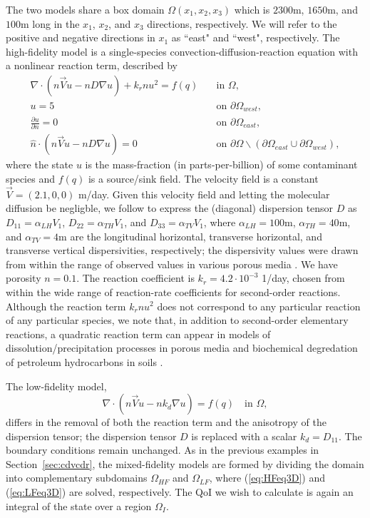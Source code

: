 The two models share a box domain $\Omega(x_1,x_2,x_3)$ which is $2300$m, $1650$m, and $100$m long in the $x_1$, $x_2$, and $x_3$ directions, respectively. We will refer to the positive and negative directions in $x_1$ as ``east" and ``west", respectively. The high-fidelity model is a single-species convection-diffusion-reaction equation with a nonlinear reaction term, described by
%
\begin{subequations}
\label{eq:cdvcdrHF3D}
\begin{align}
\nabla\cdot(n\vec{V}u - nD\nabla u) + k_rnu^2 = f(q) \quad &\text{in } \Omega, \label{eq:HFeq3D}\\
u = 5 \quad &\text{on } \partial \Omega_{west}, \\
\frac{\partial u}{\partial n} = 0 \quad &\text{on }\partial\Omega_{east}, \\
\hat{n}\cdot(n\vec{V}u - nD\nabla u) = 0 \quad &\text{on }\partial\Omega\backslash(\partial\Omega_{east}\cup\partial\Omega_{west}),
\end{align} 
\end{subequations}
%
where the state $u$ is the mass-fraction (in parts-per-billion) of some contaminant species and $f(q)$ is a source/sink field. The velocity field is a constant $\vec{V}=(2.1,0,0)$ m/day. Given this velocity field and letting the molecular diffusion be negligble, we follow \cite{Vestedetal93} to express the (diagonal) dispersion tensor $D$ as $D_{11}=\alpha_{LH}V_1$, $D_{22}=\alpha_{TH}V_1$, and $D_{33}=\alpha_{TV}V_1$, where $\alpha_{LH}=100$m, $\alpha_{TH}=40$m, and $\alpha_{TV}=4$m are the longitudinal horizontal, transverse horizontal, and transverse vertical dispersivities, respectively; the dispersivity values were drawn from within the range of observed values in various porous media \cite{Davis86}. We have porosity $n=0.1$. The reaction coefficient is $k_r=4.2\cdot10^{-3}$ 1/day, chosen from within the wide range of reaction-rate coefficients for second-order reactions. Although the reaction term $k_rnu^2$ does not correspond to any particular reaction of any particular species, we note that, in addition to second-order elementary reactions, a quadratic reaction term can appear in models of dissolution/precipitation processes in porous media \cite{Aha97} and biochemical degredation of petroleum hydrocarbons in soils \cite{Jack94}.

The low-fidelity model,
%
\begin{equation}
\nabla\cdot(n\vec{V}u - nk_d\nabla u) = f(q) \quad \text{in } \Omega, \label{eq:LFeq3D}
\end{equation}
%
differs in the removal of both the reaction term and the anisotropy of the dispersion tensor; the dispersion tensor $D$ is replaced with a scalar $k_d=D_{11}$. The boundary conditions remain unchanged. As in the previous examples in Section~\ref{sec:cdvcdr}, the mixed-fidelity models are formed by dividing the domain into complementary subdomains $\Omega_{HF}$ and $\Omega_{LF}$, where (\ref{eq:HFeq3D}) and (\ref{eq:LFeq3D}) are solved, respectively. The QoI we wish to calculate is again an integral of the state over a region $\Omega_I$. 

